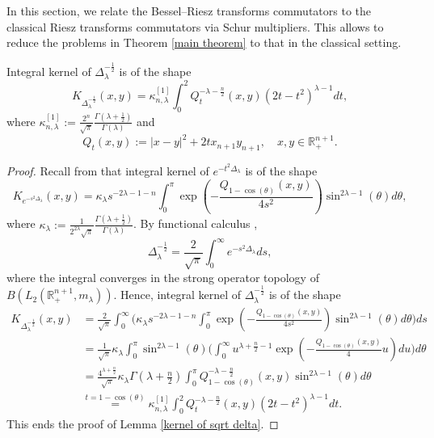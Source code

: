 \documentclass[12pt]{amsart}
\begin{document}
In this section, we relate the Bessel--Riesz transforms commutators to the classical Riesz transforms commutators via Schur multipliers. This allows to reduce the problems in Theorem \ref{main theorem} to that in the classical setting.
\begin{lemma}\label{kernel of sqrt delta} Integral kernel of $\Delta_{\lambda}^{-\frac12}$ is of the shape
$$K_{\Delta_{\lambda}^{-\frac12}}(x,y)=\kappa_{n,\lambda}^{[1]}\int_0^2Q_t^{-\lambda-\frac{n}{2}}(x,y)(2t-t^2)^{\lambda-1}dt,$$
where $\kappa_{n,\lambda}^{[1]}:=\frac{2^n}{\sqrt{\pi}}\frac{\Gamma(\lambda+\frac{1}{2})}{\Gamma(\lambda)}$ and
$$Q_t(x,y):=|x-y|^2+2tx_{n+1}y_{n+1},\quad x,y\in\mathbb{R}^{n+1}_+.$$
\end{lemma}
\begin{proof} Recall from \cite[formula (2.11)]{FLLXarxiv} that integral kernel of $e^{-t^2\Delta_{\lambda}}$ is of the shape
$$K_{e^{-s^2\Delta_{\lambda}}}(x,y)=\kappa_{\lambda}s^{-2\lambda-1-n}\int_0^{\pi}\exp(-\frac{Q_{1-\cos(\theta)}(x,y)}{4s^2})\sin^{2\lambda-1}(\theta)d\theta,$$
where $\kappa_\lambda:=\frac{1}{2^{2\lambda}\sqrt{\pi}}\frac{\Gamma(\lambda+\frac{1}{2})}{\Gamma(\lambda)}$. By functional calculus \cite{Yosida},
$$\Delta_{\lambda}^{-\frac12}=\frac{2}{\sqrt{\pi}}\int_0^{\infty}e^{-s^2\Delta_{\lambda}}ds,$$
where the integral converges in the strong operator topology of $B(L_2(\mathbb{R}_+^{n+1},m_\lambda))$.
Hence, integral kernel of $\Delta_{\lambda}^{-\frac12}$ is of the shape
\begin{align*}
K_{\Delta_{\lambda}^{-\frac12}}(x,y)
&=\frac{2}{\sqrt{\pi}}\int_0^{\infty}\Big(\kappa_{\lambda}s^{-2\lambda-1-n}\int_0^{\pi}\exp(-\frac{Q_{1-\cos(\theta)}(x,y)}{4s^2})\sin^{2\lambda-1}(\theta)d\theta\Big)ds\\
&=\frac1{\sqrt{\pi}}\kappa_{\lambda}\int_0^{\pi}\sin^{2\lambda-1}(\theta)\Big(\int_0^{\infty}u^{\lambda+\frac{n}{2}-1}\exp(-\frac{Q_{1-\cos(\theta)}(x,y)}{4}u)du\Big)d\theta\\
&=\frac{4^{\lambda+\frac{n}{2}}}{\sqrt{\pi}}\kappa_{\lambda}\Gamma(\lambda+\frac{n}{2})\int_0^{\pi}Q_{1-\cos(\theta)}^{-\lambda-\frac{n}{2}}(x,y)\sin^{2\lambda-1}(\theta)d\theta\\
&\stackrel{t=1-\cos(\theta)}{=}\kappa_{n,\lambda}^{[1]}\int_0^2Q_t^{-\lambda-\frac{n}{2}}(x,y)(2t-t^2)^{\lambda-1}dt.
\end{align*}
This ends the proof of Lemma \ref{kernel of sqrt delta}.
\end{proof}
\end{document}

